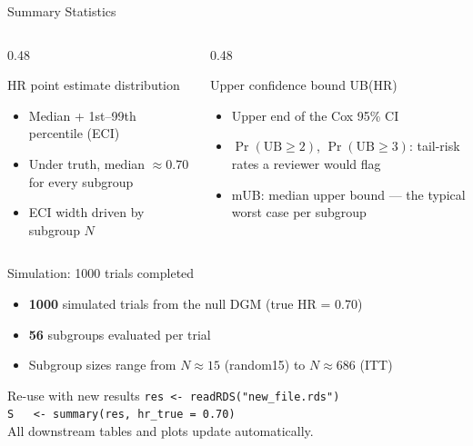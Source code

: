 \documentclass[
  11pt,
  ignorenonframetext,
  aspectratio=169,
]{beamer}
\providecommand{\tightlist}{%
  \setlength{\itemsep}{0pt}\setlength{\parskip}{0pt}}
\begin{document}
\begin{frame}{Summary Statistics}
\protect{}\label{summary-statistics}
\begin{columns}[T]
\begin{column}{0.48\linewidth}
\begin{block}{HR point estimate distribution}
\begin{itemize}\small
\item Median + 1st--99th percentile (ECI)
\item Under truth, median $\approx 0.70$ for every subgroup
\item ECI width driven by subgroup $N$
\end{itemize}
\end{block}
\end{column}

\begin{column}{0.48\linewidth}
\begin{block}{Upper confidence bound UB(HR)}
\begin{itemize}\small
\item Upper end of the Cox 95\% CI
\item $\Pr(\text{UB} \ge 2)$, $\Pr(\text{UB} \ge 3)$: tail-risk rates a reviewer would flag
\item mUB: median upper bound --- the typical worst case per subgroup
\end{itemize}
\end{block}
\end{column}
\end{columns}
\end{frame}

\begin{frame}{Simulation: 1000 trials completed}
\protect{}\label{simulation-1000-trials-completed}
\begin{itemize}
\tightlist
\item
  \textbf{1000} simulated trials from the null DGM (true HR = 0.70)
\item
  \textbf{56} subgroups evaluated per trial
\item
  Subgroup sizes range from \(N \approx 15\) (random15) to
  \(N \approx 686\) (ITT)
\end{itemize}

\begin{alertblock}{Re-use with new results}
\footnotesize
\texttt{res <- readRDS("new\_file.rds")}\\
\texttt{S~~~<- summary(res, hr\_true = 0.70)}\\
All downstream tables and plots update automatically.
\end{alertblock}
\end{frame}
\end{document}
